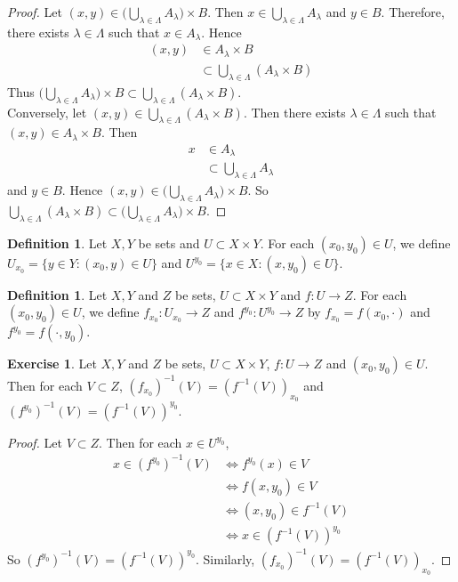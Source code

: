 \documentclass[12pt]{amsart}
\theoremstyle{definition}
\newtheorem{defn}[definition]{Definition}
\newtheorem{ex}[definition]{Exercise}
\newcommand{\lam}{\lambda}
\newcommand{\Lam}{\Lambda}
\DeclareMathOperator*{\0}{\mbf{0}}
\DeclareMathOperator*{\1}{\mbf{1}}
\begin{document}
	\begin{proof}
		Let $(x,y) \in \bigg( \bigcup\limits_{\lam \in \Lam} A_{\lam} \bigg) \times B$. Then $x \in \bigcup\limits_{\lam \in \Lam} A_{\lam}$ and $y \in B$. Therefore, there exists $\lam \in \Lam$ such that $x \in A_{\lam}$. Hence 
		\begin{align*}
			(x,y) 
			& \in A_{\lam} \times B \\
			& \subset \bigcup\limits_{\lam \in \Lam} (A_{\lam} \times B)
		\end{align*}
		Thus $\bigg( \bigcup\limits_{\lam \in \Lam} A_{\lam} \bigg) \times B \subset  \bigcup\limits_{\lam \in \Lam} (A_{\lam} \times B)$. \\
		Conversely, let $(x,y) \in \bigcup\limits_{\lam \in \Lam} (A_{\lam} \times B)$. Then there exists $\lam \in \Lam$ such that $(x,y) \in A_{\lam} \times B$. Then 
		\begin{align*}
			x 
			& \in A_{\lam} \\
			& \subset \bigcup_{\lam \in \Lam} A_{\lam}
		\end{align*}
		and $y \in B$. Hence $(x,y) \in \bigg( \bigcup\limits_{\lam \in \Lam} A_{\lam} \bigg) \times B$. So $ \bigcup\limits_{\lam \in \Lam} (A_{\lam} \times B) \subset \bigg( \bigcup\limits_{\lam \in \Lam} A_{\lam} \bigg) \times B$.
	\end{proof}

	\begin{defn}
		Let $X, Y$ be sets and $U \subset X \times Y$. For each $(x_0, y_0) \in U$, we define $U_{x_0} = \{y \in Y: (x_0,y) \in U\}$ and $U^{y_0} = \{x \in X: (x,y_0) \in U\}$.
	\end{defn}

	\begin{defn}
		Let $X, Y$ and $Z$ be sets, $U \subset X \times Y$ and $f: U \rightarrow Z$. For each $(x_0, y_0) \in U$, we define $f_{x_0}: U_{x_0} \rightarrow Z$ and $f^{y_0}: U^{y_0} \rightarrow Z$ by $f_{x_0} = f(x_0, \cdot)$ and $f^{y_0} = f(\cdot, y_0)$.
	\end{defn}
	
	\begin{ex}
		Let $X, Y$ and $Z$ be sets, $U \subset X \times Y$, $f: U \rightarrow Z$ and $(x_0, y_0) \in U$. Then for each $V \subset Z$, $(f_{x_0})^{-1}(V) = (f^{-1}(V))_{x_0}$ and $(f^{y_0})^{-1}(V) = (f^{-1}(V))^{y_0}$.
	\end{ex}

	\begin{proof}
		Let $V \subset Z$. Then for each $x \in U^{y_0}$,
		\begin{align*}
			x \in (f^{y_0})^{-1}(V) 
			& \iff f^{y_0}(x) \in V \\
			& \iff f(x, y_0) \in V \\
			& \iff (x, y_0) \in f^{-1}(V) \\
			& \iff x \in (f^{-1}(V))^{y_0}
		\end{align*}
		So $(f^{y_0})^{-1}(V) = (f^{-1}(V))^{y_0}$. Similarly, $(f_{x_0})^{-1}(V) = (f^{-1}(V))_{x_0}$. 
	\end{proof}
	
\end{document}
